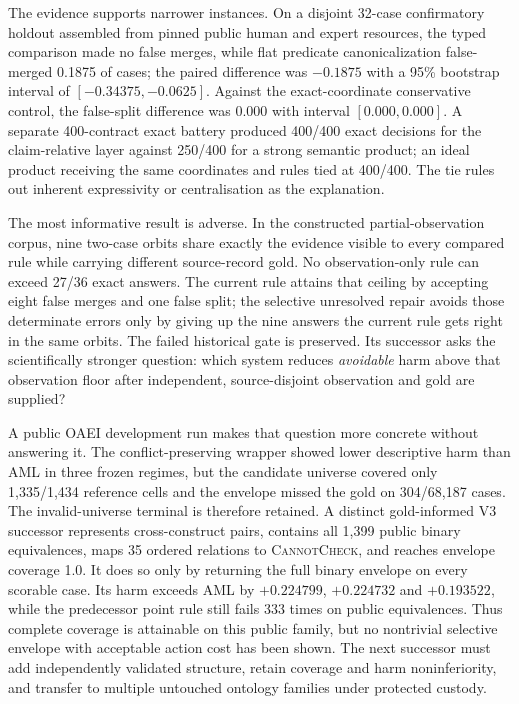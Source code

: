 The evidence supports narrower instances. On a disjoint 32-case confirmatory
holdout assembled from pinned public human and expert resources, the typed
comparison made no false merges, while flat predicate canonicalization
false-merged 0.1875 of cases; the paired difference was $-0.1875$ with a 95\%
bootstrap interval of $[-0.34375,-0.0625]$. Against the exact-coordinate
conservative control, the false-split difference was $0.000$ with interval
$[0.000,0.000]$. A separate 400-contract exact battery produced 400/400 exact
decisions for the claim-relative layer against 250/400 for a strong semantic
product; an ideal product receiving the same coordinates and rules tied at
400/400. The tie rules out inherent expressivity or centralisation as the
explanation.

The most informative result is adverse. In the constructed
partial-observation corpus, nine two-case orbits share exactly the evidence
visible to every compared rule while carrying different source-record gold.
No observation-only rule can exceed 27/36 exact answers. The current rule
attains that ceiling by accepting eight false merges and one false split; the
selective unresolved repair avoids those determinate errors only by giving up
the nine answers the current rule gets right in the same orbits. The failed
historical gate is preserved. Its successor asks the scientifically stronger
question: which system reduces \emph{avoidable} harm above that observation
floor after independent, source-disjoint observation and gold are supplied?

A public OAEI development run makes that question more concrete without
answering it.  The conflict-preserving wrapper showed lower descriptive harm
than AML in three frozen regimes, but the candidate universe covered only
1,335/1,434 reference cells and the envelope missed the gold on 304/68,187
cases. The invalid-universe terminal is therefore retained. A distinct
gold-informed V3 successor represents cross-construct pairs, contains all
1,399 public binary equivalences, maps 35 ordered relations to
\textsc{CannotCheck}, and reaches envelope coverage 1.0. It does so only by
returning the full binary envelope on every scorable case. Its harm exceeds AML
by $+0.224799$, $+0.224732$ and $+0.193522$, while the predecessor point rule
still fails 333 times on public equivalences. Thus complete coverage is
attainable on this public family, but no nontrivial selective envelope with
acceptable action cost has been shown. The next successor must add
independently validated structure, retain coverage and harm noninferiority, and
transfer to multiple untouched ontology families under protected custody.

